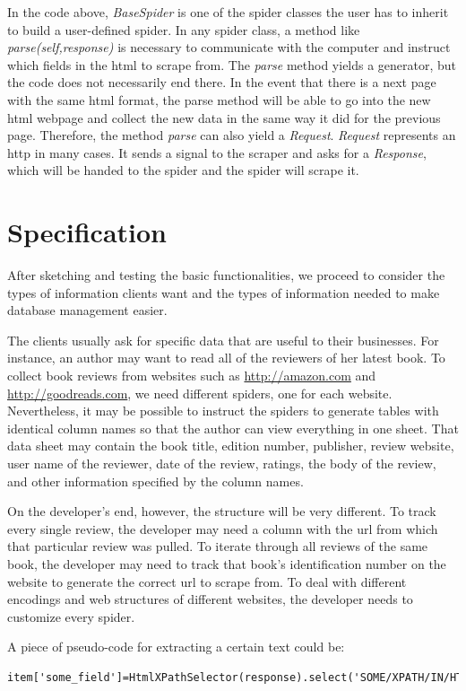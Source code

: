 \documentclass[12pt]{report}
\begin{document}
In the code above, \textit{BaseSpider} is one of the spider classes the user has to inherit to build a user-defined spider. In any spider class, a method like \textit{parse(self,response)} is necessary to communicate with the computer and instruct which fields in the html to scrape from. The \textit{parse} method yields a generator, but the code does not necessarily end there. In the event that there is a next page with the same html format, the parse method will be able to go into the new html webpage and collect the new data in the same way it did for the previous page. Therefore, the method \textit{parse} can also yield a \textit{Request}. \textit{Request} represents an \gls{http} in many cases. It sends a signal to the scraper and asks for a \textit{Response}, which will be handed to the spider and the spider will scrape it.

\section{Specification}

After sketching and testing the basic functionalities, we proceed to consider the types of information clients want and the types of information needed to make database management easier. 

The clients usually ask for specific data that are useful to their businesses. For instance, an author may want to read all of the reviewers of her latest book. To collect book reviews from websites such as \url{http://amazon.com} and \url{http://goodreads.com}, we need different spiders, one for each website. Nevertheless, it may be possible to instruct the spiders to generate tables with identical column names so that the author can view everything in one sheet. That data sheet may contain the book title, edition number, publisher, review website, user name of the reviewer, date of the review, ratings, the body of the review, and other information specified by the column names.

On the developer's end, however, the structure will be very different. To track every single review, the developer may need a column with the url from which that particular review was pulled. To iterate through all reviews of the same book, the developer may need to track that book's identification number on the website to generate the correct url to scrape from. To deal with different encodings and web structures of different websites, the developer needs to customize every spider.

A piece of pseudo-code for extracting a certain text could be:
\begin{lstlisting}
item['some_field']=HtmlXPathSelector(response).select('SOME/XPATH/IN/HTML/text()').extract()
\end{lstlisting}
\end{document}

